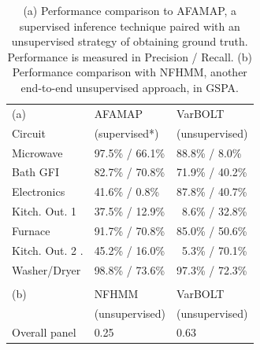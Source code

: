 \begin{table}
\centering
\begin{tabular}{lll}
 (a)    & AFAMAP     & VarBOLT \\
   Circuit                 &  (supervised*)& (unsupervised) \\
                        \hline
                        \hline
    Microwave & 97.5\% / 66.1\%  & 88.8\% / 8.0\%     \\
    Bath GFI    & 82.7\% / 70.8\% & 71.9\% / 40.2\%      \\
    Electronics     & 41.6\% / 0.8\%    & 87.8\% / 40.7\%  \\
    Kitch. Out. 1 & 37.5\% / 12.9\%       &\ 8.6\% / 32.8\%  \\
    Furnace & 91.7\% / 70.8\%  & 85.0\% / 50.6\%  \\
    Kitch. Out. 2 .& 45.2\% / 16.0\%       & \ 5.3\% / 70.1\%  \\
     Washer/Dryer & 98.8\% / 73.6\%   & 97.3\% / 72.3\% \\
     \hline
     \vspace{0.01cm}\\
      (b)& NFHMM     & VarBOLT \\
      &  (unsupervised)& (unsupervised) \\
      \hline
      \hline
      Overall panel & 0.25 & 0.63 \\
      \hline
  \end{tabular}
  \caption[VarBOLT: Performance comparison]{(a) Performance comparison to AFAMAP, a supervised inference technique paired with an unsupervised strategy of obtaining ground truth. Performance is measured in Precision / Recall. (b) Performance comparison with NFHMM, another end-to-end unsupervised approach, in GSPA.}
  \label{vbolt:results}
  \end{table}

